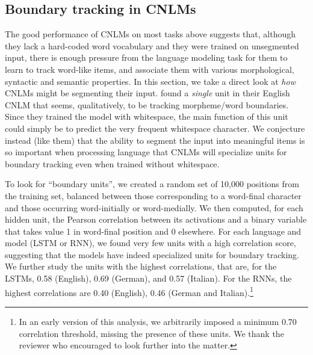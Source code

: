 \subsection{Boundary tracking in CNLMs}
\label{sec:segmentation}


The good performance of CNLMs on most tasks above suggests that,
although they lack a hard-coded word vocabulary and they were trained
on unsegmented input, there is enough pressure from the language
modeling task for them to learn to track word-like items, and
associate them with various morphological, syntactic and semantic
properties. In this section, we take a direct look at \emph{how} CNLMs
might be segmenting their input.
 found a \emph{single} unit in
their English CNLM that seems, qualitatively, to be tracking
morpheme/word boundaries.  Since they trained the model with
whitespace, the main function of this unit could simply be to predict
the very frequent whitespace character. We conjecture instead (like them) that the
ability to segment the input into meaningful items is so important
when processing language that CNLMs will specialize units for boundary
tracking even when trained without whitespace.

To look for ``boundary units'', we created a random set of 10,000
positions from the training set, balanced between those corresponding
to a word-final character and those occurring word-initially or
word-medially.  We then computed, for each hidden unit, the Pearson
correlation between its activations and a binary variable that takes value 1 in
word-final position and 0 elsewhere. %
For each language and model (LSTM or RNN), we found very few units
with a high correlation score, suggesting that the models have indeed
specialized units for boundary tracking. We further study the units
with the highest correlations, that are, for the LSTMs, 0.58
(English), 0.69 (German), and 0.57 (Italian).  For the RNNs, the
highest correlations are 0.40 (English), 0.46 (German and
Italian).\footnote{In an early version of this analysis, we
  arbitrarily imposed a minimum 0.70 correlation threshold, missing
  the presence of these units. We thank the reviewer who encouraged to
  look further into the matter.}

